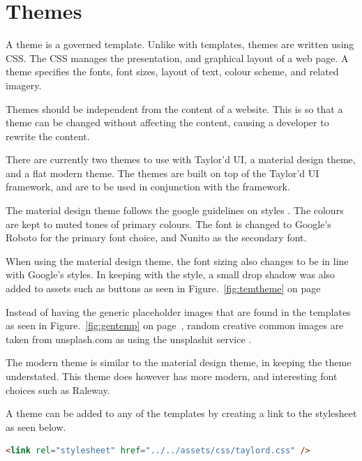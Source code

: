 \newpage
\chapter*{Themes}

A theme is a governed template. Unlike with templates, themes are written using \gls{CSS}. The \gls{CSS} manages the presentation, and graphical layout of a web page. A theme specifies the fonts, font sizes, layout of text, colour scheme, and related imagery. 

Themes should be independent from the content of a website. This is so that a theme can be changed without affecting the content, causing a developer to rewrite the content. 

There are currently two themes to use with Taylor'd UI, a material design theme, and a flat modern theme. The themes are built on top of the Taylor'd UI framework, and are to be used in conjunction with the framework.

The material design theme follows the google guidelines on styles \citep{Google17}. The colours are kept to muted tones of primary colours. The font is changed to Google's Roboto for the primary font choice, and Nunito as the secondary font.

When using the material design theme, the font sizing also changes to be in line with Google's styles. In keeping with the style, a small drop shadow was also added to assets such as buttons as seen in Figure.~\ref{fig:temtheme} on  page~\pageref{fig:temtheme}

Instead of having the generic placeholder images that are found in the templates as seen in Figure.~\ref{fig:gentemp} on  page~\pageref{fig:gentemp}, random creative common images are taken from unsplash.com as using the unsplashit service \citep{SPL17}. 

The modern theme is similar to the material design theme, in keeping the theme understated. This theme does however has more modern, and interesting font choices such as Raleway. 

A theme can be added to any of the templates by creating a link to the stylesheet as seen below.

\begin{lstlisting}[language=HTML]
 <link rel="stylesheet" href="../../assets/css/taylord.css" />
\end{lstlisting}

